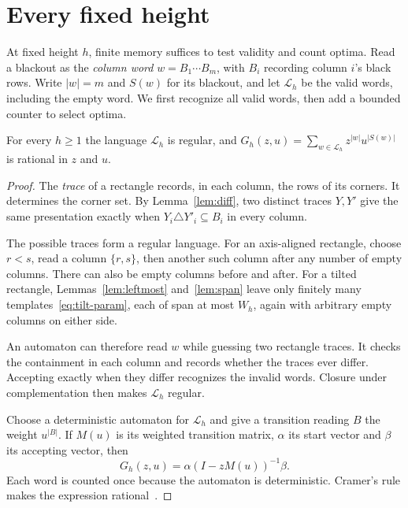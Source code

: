 \section{Every fixed height}\label{sec:height}

At fixed height $h$, finite memory suffices to test validity and count optima.
Read a blackout as the \emph{column word} $w=B_1\cdots B_m$, with $B_i$
recording column $i$'s black rows. Write $|w|=m$ and $S(w)$ for its blackout,
and let $\mathcal L_h$ be the valid words, including the empty word.
We first recognize all valid words, then add a bounded counter to select optima.

\begin{theorem}\label{thm:regular}
For every $h\ge1$ the language $\mathcal L_h$ is regular, and $G_h(z,u)=\sum_{w\in\mathcal L_h}z^{|w|}u^{|S(w)|}$ is rational in $z$ and $u$.
\end{theorem}

\begin{proof}
The \emph{trace} of a rectangle records, in each column, the rows of its
corners. It determines the corner set. By Lemma~\ref{lem:diff}, two distinct
traces $Y,Y'$ give the same presentation exactly when
$Y_i\triangle Y'_i\subseteq B_i$ in every column.

The possible traces form a regular language. For an axis-aligned rectangle,
choose $r<s$, read a column $\{r,s\}$, then another such column after any
number of empty columns. There can also be empty columns before and after.
For a tilted rectangle, Lemmas~\ref{lem:leftmost} and~\ref{lem:span} leave
only finitely many templates~\eqref{eq:tilt-param}, each of span at most
$W_h$, again with arbitrary empty columns on either side.

An automaton can therefore read $w$ while guessing two rectangle traces.
It checks the containment in each column and records whether the traces ever
differ. Accepting exactly when they differ recognizes the invalid words.
Closure under complementation then makes $\mathcal L_h$ regular.

Choose a deterministic automaton for $\mathcal L_h$ and give a transition
reading $B$ the weight $u^{|B|}$. If $M(u)$ is its weighted transition
matrix, $\alpha$ its start vector and $\beta$ its accepting vector, then
\[
 G_h(z,u)=\alpha(I-zM(u))^{-1}\beta .
\]
Each word is counted once because the automaton is deterministic. Cramer's
rule makes the expression rational~\cite[Proposition~V.6]{flajolet2009}.
\end{proof}

